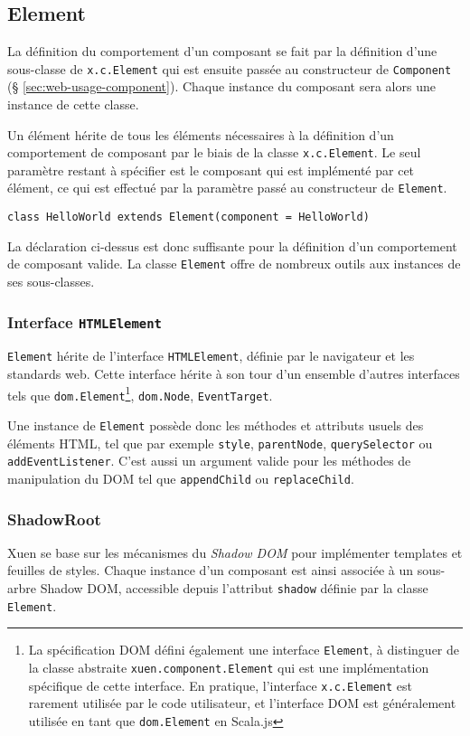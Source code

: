 \subsection{Element} \label{sec:web-specs-element}

La définition du comportement d'un composant se fait par la définition d'une sous-classe de \texttt{x.c.Element} qui est ensuite passée au constructeur de \texttt{Component} (§ \ref{sec:web-usage-component}). Chaque instance du composant sera alors une instance de cette classe.

Un élément hérite de tous les éléments nécessaires à la définition d'un comportement de composant par le biais de la classe \texttt{x.c.Element}. Le seul paramètre restant à spécifier est le composant qui est implémenté par cet élément, ce qui est effectué par la paramètre passé au constructeur de \texttt{Element}.
\begin{lstlisting}
class HelloWorld extends Element(component = HelloWorld)
\end{lstlisting}

La déclaration ci-dessus est donc suffisante pour la définition d'un comportement de composant valide. La classe \texttt{Element} offre de nombreux outils aux instances de ses sous-classes.

\subsubsection{Interface \texttt{HTMLElement}}
\texttt{Element} hérite de l'interface \texttt{HTMLElement}, définie par le navigateur et les standards web. Cette interface hérite à son tour d'un ensemble d'autres interfaces tels que \texttt{dom.Element}\footnote{La spécification DOM défini également une interface \texttt{Element}, à distinguer de la classe abstraite \texttt{xuen.component.Element} qui est une implémentation spécifique de cette interface. En pratique, l'interface \texttt{x.c.Element} est rarement utilisée par le code utilisateur, et l'interface DOM est généralement utilisée en tant que \texttt{dom.Element} en Scala.js}, \texttt{dom.Node}, \texttt{EventTarget}.

Une instance de \texttt{Element} possède donc les méthodes et attributs usuels des éléments HTML, tel que par exemple \texttt{style}, \texttt{parentNode}, \texttt{querySelector} ou \texttt{addEventListener}. C'est aussi un argument valide pour les méthodes de manipulation du DOM tel que \texttt{appendChild} ou \texttt{replaceChild}.

\subsubsection{ShadowRoot}
Xuen se base sur les mécanismes du \emph{Shadow DOM} pour implémenter templates et feuilles de styles. Chaque instance d'un composant est ainsi associée à un sous-arbre Shadow DOM, accessible depuis l'attribut \texttt{shadow} définie par la classe \texttt{Element}.

